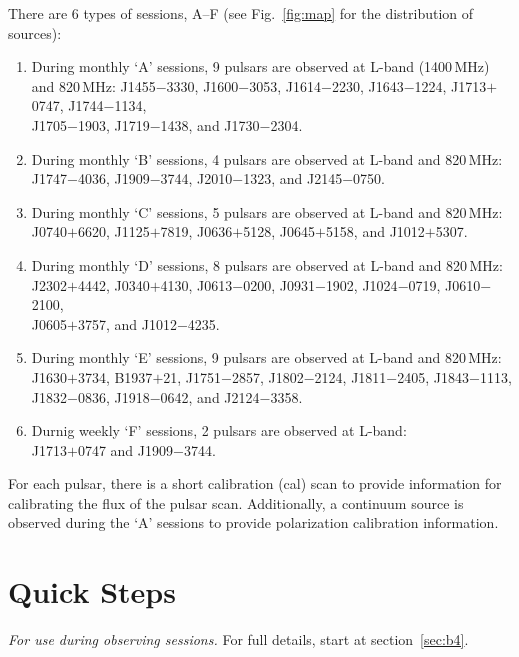 \documentclass[11pt, reqno, tbtags]{article}
\begin{document}
\noindent There are 6 types of sessions, A--F (see Fig.~\ref{fig:map} for the distribution of sources):            
\begin{enumerate}[{Session} A:]
 \item During monthly `A' sessions, 9 pulsars are observed at L-band (1400\,MHz) and 820\,MHz: J1455$-$3330, J1600$-$3053, J1614$-$2230, J1643$-$1224, J1713$+$0747, J1744$-$1134, \\ J1705$-$1903, J1719$-$1438, and J1730$-$2304.         
 \item During monthly `B' sessions, 4 pulsars are observed at L-band and 820\,MHz: \\J1747$-$4036, J1909$-$3744, J2010$-$1323, and J2145$-$0750.  
 \item During monthly `C' sessions, 5 pulsars are observed at L-band and 820\,MHz: \\J0740$+$6620, J1125$+$7819, J0636$+$5128, J0645$+$5158, and J1012$+$5307.  
 \item During monthly `D' sessions, 8 pulsars are observed at L-band and 820\,MHz: \\J2302$+$4442, J0340$+$4130, J0613$-$0200, J0931$-$1902, J1024$-$0719, J0610$-$2100,\\ J0605$+$3757, and J1012$-$4235.          
 \item During monthly `E' sessions, 9 pulsars are observed at L-band and 820\,MHz: \\J1630$+$3734, B1937$+$21, J1751$-$2857, J1802$-$2124, J1811$-$2405, J1843$-$1113,\\ J1832$-$0836, J1918$-$0642, and J2124$-$3358.  
 \item Durnig weekly `F' sessions, 2 pulsars are observed at L-band: \\J1713$+$0747 and J1909$-$3744.
\end{enumerate}
\vspace{0.5cm}

For each pulsar, there is a short calibration (cal) scan to provide information for calibrating the flux of the pulsar scan.  Additionally, a continuum source is observed during the `A' sessions to provide polarization calibration information.  
\newpage


\section{Quick Steps}  %
\label{ssec:quick}
\textit{For use during observing sessions.}  For full details, start at section~\ref{sec:b4}.  
\end{document}

